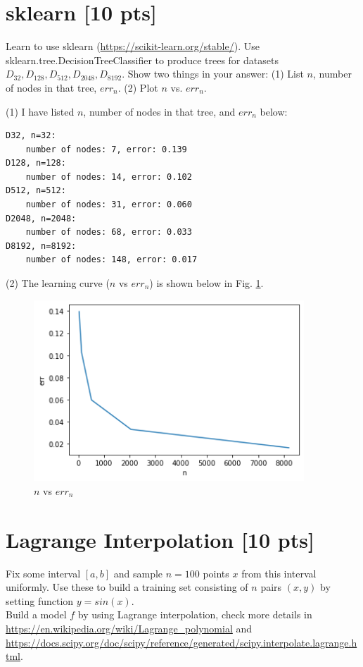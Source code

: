 \documentclass[a4paper]{article}
\theoremstyle{definition}
\begin{document}
\section{sklearn [10 pts]}
Learn to use sklearn (\url{https://scikit-learn.org/stable/}).
Use sklearn.tree.DecisionTreeClassifier to produce trees for datasets $D_{32}, D_{128}, D_{512}, D_{2048}, D_{8192}$.  Show two things in your answer: (1) List $n$, number of nodes in that tree, $err_n$. (2) Plot $n$ vs. $err_n$.

{\color{blue}

(1) I have listed $n$, number of nodes in that tree, and $err_{n}$ below:

\begin{verbatim}
D32, n=32:
    number of nodes: 7, error: 0.139
D128, n=128:
    number of nodes: 14, error: 0.102
D512, n=512:
    number of nodes: 31, error: 0.060
D2048, n=2048:
    number of nodes: 68, error: 0.033
D8192, n=8192:
    number of nodes: 148, error: 0.017
\end{verbatim}

(2) The learning curve ($n$ vs $err_{n}$) is shown below in Fig. \ref{P3}.
}

\begin{figure}[htbp]
\centering
\includegraphics[width=4in]{P3.png}
\caption{$n$ vs $err_{n}$}
\label{P3}
\end{figure}

\section{Lagrange Interpolation [10 pts]}
Fix some interval $[a, b]$ and sample $n = 100$ points $x$ from this interval uniformly. Use these to build a training set consisting of $n$ pairs $(x, y)$ by setting function $y = sin(x)$. \\

Build a model $f$ by using Lagrange interpolation, check more details in \url{https://en.wikipedia.org/wiki/Lagrange_polynomial} and \url{https://docs.scipy.org/doc/scipy/reference/generated/scipy.interpolate.lagrange.html}. \\
\end{document}

